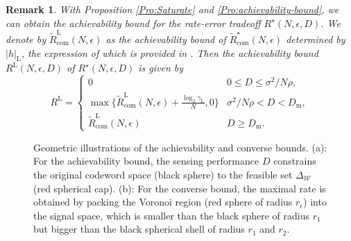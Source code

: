 \documentclass[conference,a4paper]{IEEEtran}
\newtheorem{remark}{Remark}
\begin{document}
\begin{remark}
With Proposition \ref{Pro:Saturate} and \ref{Pro:achievability-bound}, we can obtain the achievability bound for the rate-error tradeoff $R^\star(N,\epsilon,D)$. We denote by $\tilde{R}^\mathrm{L}_\mathrm{com}(N,\epsilon)$ as the achievability bound of $\tilde{R}^\star_\mathrm{com}(N,\epsilon)$ determined by $|h|_\mathrm{L}$, the expression of which is provided in \cite{YanDurKoc:C13}. Then the achievability bound $R^\mathrm{L}(N,\epsilon,D)$ of $R^\star(N,\epsilon,D)$ is given by
\begin{equation}
    R^\mathrm{L} = \begin{cases}
    0 & 0\leq D\leq{\sigma^2}/{N\rho},\\
    \max\{\tilde{R}_\mathrm{com}^\mathrm{L}(N,\epsilon)+\frac{\log_2 \gamma_\mathrm{L}}{N},0\} & {\sigma^2}/{N\rho}< D <D_\mathrm{m},\\
    \tilde{R}^\mathrm{L}_\mathrm{com}(N,\epsilon) & D\geq D_\mathrm{m}.
    \end{cases}
\end{equation}
\end{remark}
\hspace{-1cm}

\begin{figure}[t]
    \centering
    \subfigbottomskip=2pt 
	\subfigcapskip=-5pt 
    \caption{ Geometric illustrations of the achievability and converse bounds. (a): For the achievability bound, the sensing performance $D$ constrains the original codeword space (black sphere) to the feasible set $\Delta_\mathcal{W}$ (red spherical cap). (b): For the converse bound, the maximal rate is obtained by packing the Voronoi region (red sphere of radius $r_\epsilon$) into the signal space, which is smaller than the black sphere of radius $r_1$ but bigger than the black spherical shell of radius $r_1$ and $r_2$.}
    \label{Fig_rate_error}
\end{figure}
\end{document}
